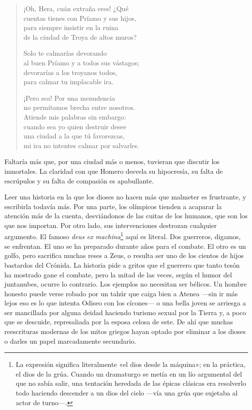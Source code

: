 \documentclass[11pt,a4paper]{article}
\begin{document}
\begin{verse}
¡Oh, Hera, cuán extraña eres! ¿Qué\\
cuentas tienes con Príamo y sus hijos,\\
para siempre insistir en la ruina\\
de la ciudad de Troya de altos muros?

Solo te calmarías devorando\\
al buen Príamo y a todos sus vástagos;\\
devorarías a los troyanos todos,\\
para calmar tu implacable ira.

¡Pero sea! Por una menudencia\\
no permitamos brecha entre nosotros.\\
Atiende mis palabras sin embargo:\\
cuando sea yo quien destruir desee\\
una ciudad a la que tú favorezcas,\\
mi ira no intentes calmar por salvarles.
\end{verse}

Faltaría más que, por una ciudad más o menos, tuvieran que discutir los inmortales. La claridad con que Homero desvela su hipocresía, su falta de escrúpulos y su falta de compasión es apabullante.

Leer una historia en la que los dioses no hacen más que malmeter es frustrante, y escribirla todavía más. Por una parte, los olímpicos tienden a acaparar la atención más de la cuenta, desviándonos de las cuitas de los humanos, que son los que nos importan. Por otro lado, sus intervenciones destrozan cualquier argumento. El famoso \emph{deus ex machina}\footnote{La expresión significa literalmente «el dios desde la máquina»; en la práctica, el dios de la grúa. Cuando un dramaturgo se metía en un lío argumental del que no sabía salir, una tentación heredada de las épicas clásicas era resolverlo todo haciendo descender a un dios del cielo ---vía una grúa que sujetaba al actor de turno---.} aquí es literal. Dos guerreros, digamos, se enfrentan. El uno se ha preparado durante años para el combate. El otro es un golfo, pero sacrifica muchas reses a Zeus, o resulta ser uno de los cientos de hijos bastardos del Crónida. La historia pide a gritos que el guerrero que tanto tesón ha mostrado gane el combate, pero la mitad de las veces, según el humor del juntanubes, ocurre lo contrario. Los ejemplos no necesitan ser bélicos. Un hombre honesto puede verse robado por un tahúr que caiga bien a Atenea ---sin ir más lejos eso es lo que intenta Odiseo con los cícones--- o una bella joven se arriesga a ser mancillada por alguna deidad haciendo turismo sexual por la Tierra y, a poco que se descuide, represaliada por la esposa celosa de este. De ahí que muchas reescrituras modernas de los mitos griegos hayan optado por eliminar a los dioses o darles un papel marcadamente secundario.
\end{document}
